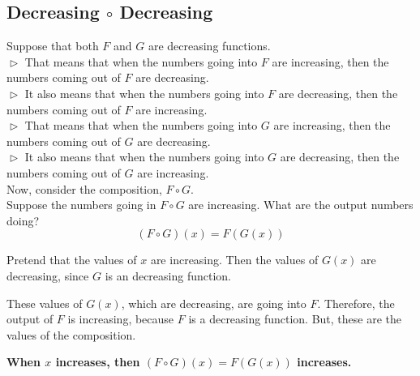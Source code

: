 \documentclass{ximera}
\begin{document}
\subsection*{Decreasing $\circ$ Decreasing}


Suppose that both $F$ and $G$ are decreasing functions. \\

$\vartriangleright$ That means that when the numbers going into $F$ are increasing, then the numbers coming out of $F$ are decreasing. \\


$\vartriangleright$ It also means that when the numbers going into $F$ are decreasing, then the numbers coming out of $F$ are increasing. \\


$\vartriangleright$ That means that when the numbers going into $G$ are increasing, then the numbers coming out of $G$ are decreasing. \\



$\vartriangleright$ It also means that when the numbers going into $G$ are decreasing, then the numbers coming out of $G$ are increasing. \\


Now, consider the composition, $F \circ G$. \\


Suppose the numbers going in $F \circ G$ are increasing.  What are the output numbers doing? \\




\[ (F \circ G)(x) = F(G(x)) \]


Pretend that the values of $x$ are increasing. Then the values of $G(x)$ are decreasing, since $G$ is an decreasing function.

These values of $G(x)$, which are decreasing, are going into $F$.  Therefore, the output of $F$ is increasing, because $F$ is a decreasing function.  But, these are the values of the composition.



\begin{center}
\textbf{\textcolor{red!70!black}{When $x$ increases, then $(F \circ G)(x) = F(G(x))$ increases.}}
\end{center}
\end{document}
